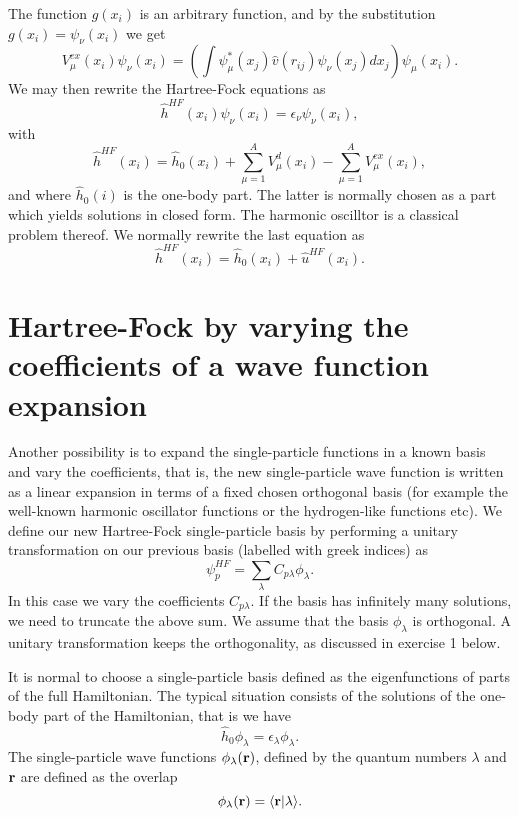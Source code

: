 \documentclass[graybox,sectrefs,envcountresetchap,open=right]{svmonodo}
\begin{document}
The function $g(x_i)$ is an arbitrary function,
and by the substitution $g(x_i) = \psi_{\nu}(x_i)$
we get
\begin{equation*}
  V_{\mu}^{ex}(x_i) \psi_{\nu}(x_i) 
  = \left(\int \psi_{\mu}^*(x_j) 
 \hat{v}(r_{ij})\psi_{\nu}(x_j)
  dx_j\right)\psi_{\mu}(x_i).
\end{equation*}
We may then rewrite the Hartree-Fock equations as
\[
  \hat{h}^{HF}(x_i) \psi_{\nu}(x_i) = \epsilon_{\nu}\psi_{\nu}(x_i),
\]
with
\[
  \hat{h}^{HF}(x_i)= \hat{h}_0(x_i) + \sum_{\mu=1}^AV_{\mu}^{d}(x_i) -
  \sum_{\mu=1}^AV_{\mu}^{ex}(x_i),
\]
and where $\hat{h}_0(i)$ is the one-body part. The latter is normally chosen as a part which yields solutions in closed form. The harmonic oscilltor is a classical problem thereof.
We normally rewrite the last equation as
\[
  \hat{h}^{HF}(x_i)= \hat{h}_0(x_i) + \hat{u}^{HF}(x_i). 
\]




\section{Hartree-Fock by varying the coefficients of a wave function expansion}

Another possibility is to expand the single-particle functions in a known basis  and vary the coefficients, 
that is, the new single-particle wave function is written as a linear expansion
in terms of a fixed chosen orthogonal basis (for example the well-known harmonic oscillator functions or the hydrogen-like functions etc).
We define our new Hartree-Fock single-particle basis by performing a unitary transformation 
on our previous basis (labelled with greek indices) as
\begin{equation}
\psi_p^{HF}  = \sum_{\lambda} C_{p\lambda}\phi_{\lambda}. \label{eq:newbasis}
\end{equation}
In this case we vary the coefficients $C_{p\lambda}$. If the basis has infinitely many solutions, we need
to truncate the above sum.  We assume that the basis $\phi_{\lambda}$ is orthogonal. A unitary transformation keeps the orthogonality, as discussed in exercise 1 below.  


It is normal to choose a single-particle basis defined as the eigenfunctions
of parts of the full Hamiltonian. The typical situation consists of the solutions of the one-body part of the Hamiltonian, that is we have
\[
\hat{h}_0\phi_{\lambda}=\epsilon_{\lambda}\phi_{\lambda}.
\]
The single-particle wave functions $\phi_{\lambda}({\bf r})$, defined by the quantum numbers $\lambda$ and ${\bf r}$
are defined as the overlap 
\[
   \phi_{\lambda}({\bf r})  = \langle {\bf r} | \lambda \rangle .
\]
\end{document}
